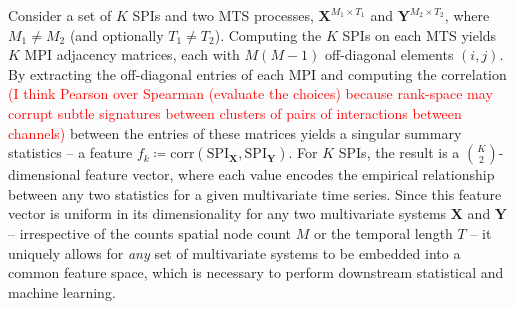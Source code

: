 \documentclass{article}
\theoremstyle{plain}
\theoremstyle{definition}
\theoremstyle{remark}
\begin{document}
Consider a set of $K$ SPIs and two MTS processes, $\mathbf{X}^{M_1 \times T_1}$ and $\mathbf{Y}^{M_2 \times T_2}$, where $M_1 \neq M_2$ (and optionally $T_1 \neq T_2$). Computing the $K$ SPIs on each MTS yields $K$ MPI adjacency matrices, each with $M(M-1)$ off-diagonal elements $(i, j)$. By extracting the off-diagonal entries of each MPI and computing the correlation \textcolor{red}{(I think Pearson over Spearman (evaluate the choices) because rank-space may corrupt subtle signatures between clusters of pairs of interactions between channels)} between the entries of these matrices yields a singular summary statistics -- a feature $f_k \coloneqq \mathrm{corr}(\mathrm{SPI}_{\mathbf{X}}, \mathrm{SPI}_{\mathbf{Y}})$. For $K$ SPIs, the result is a ${K \choose 2}$-dimensional feature vector, where each value encodes the empirical relationship between any two statistics for a given multivariate time series. Since this feature vector is uniform in its dimensionality for any two multivariate systems $\mathbf{X}$ and $\mathbf{Y}$ -- irrespective of the counts spatial node count $M$ or the temporal length $T$ -- it uniquely allows for \textit{any} set of multivariate systems to be embedded into a common feature space, which is necessary to perform downstream statistical and machine learning.
\end{document}
